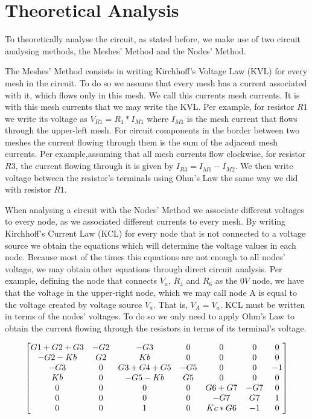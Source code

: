 \section{Theoretical Analysis}
\label{sec:analysis}

To theoretically analyse the circuit, as stated before, we make use of two circuit analysing methods, the Meshes' Method and the Nodes' Method.

The Meshes' Method consists in writing Kirchhoff's Voltage Law (KVL) for every mesh in the circuit. To do so we assume that every mesh has a current associated with it, which flows only in this mesh. We call this currents mesh currents. It is with this mesh currents that we may write the KVL. Per example, for resistor $R1$ we write its voltage as $V_{R1} =R_1*I_{M1}$ where $I_{M1}$ is the mesh current that flows through the upper-left mesh. For circuit components in the border between two meshes the current flowing through them is the sum of the adjacent mesh currents. Per example,assuming that all mesh currents flow clockwise, for resistor $R3$, the current flowing through it is given by $I_{R3} = I_{M1}-I_{M2}$. We then write voltage between the resistor's terminals using Ohm's Law the same way we did with resistor $R1$.

When analysing a circuit with the Nodes' Method we associate different voltages to every node, as we associated different currents to every mesh. By writing Kirchhoff's Current Law (KCL) for every node that is not connected to a voltage source we obtain the equations which will determine the voltage values in each node. Because most of the times this equations are not enough to all nodes' voltage, we may obtain other equations through direct circuit analysis. Per example, defining the node that connects $V_a$, $R_4$ and $R_6$ as the $0V$ node, we have that the voltage in the upper-right node, which we may call node A is equal to the voltage created by voltage source $V_a$. That is, $V_A = V_a$. KCL must be written in terms of the nodes' voltages. To do so we only need to apply Ohm's Law to obtain the current flowing through the resistors in terms of its terminal's voltage.

\begin{equation}
\begin{bmatrix}
\centering
G1+G2+G3 & -G2 & -G3 & 0 & 0 & 0 & 0\\ %
-G2-Kb & G2 & Kb & 0 & 0 & 0 & 0\\ %
-G3 & 0 & G3+G4+G5 & -G5 & 0 & 0 & -1\\ %
Kb & 0 & -G5-Kb & G5 & 0 & 0 & 0\\ %
0 & 0 & 0 & 0 & G6+G7 & -G7 & 0\\ %
0 & 0 & 0 & 0 & -G7 & G7 & 1\\ %
0 & 0 & 1 & 0 & Kc*G6 & -1 & 0 %
\end{bmatrix}
\end{equation}

